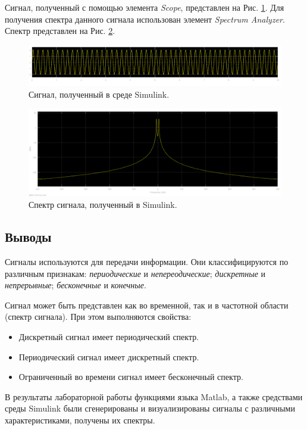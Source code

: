 \documentclass[a4paper,14pt]{extarticle}
\begin{document}
Сигнал, полученный с помощью элемента \textit{Scope}, представлен на Рис. \ref{simulink_signal}. Для получения спектра данного сигнала использован элемент \textit{Spectrum Analyzer}. Спектр представлен на Рис. \ref{simulink_signal_}.
\begin{figure}[H]
\centering
\includegraphics[scale=0.5]{pics/1simulink_001.png}
\caption{Сигнал, полученный в среде Simulink.}
\label{simulink_signal}
\end{figure}
\begin{figure}[H]
\centering
\includegraphics[scale=0.5]{pics/1simulink_spec.png}
\caption{Спектр сигнала, полученный в Simulink.}
\label{simulink_signal_}
\end{figure}

\subsection{Выводы}
Сигналы используются для передачи информации. Они классифицируются по различным признакам: \textit{периодические} и \textit{непереодические}; \textit{дискретные} и \textit{непрерывные}; \textit{бесконечные} и \textit{конечные}.

Сигнал может быть представлен как во временной, так и в частотной области (спектр сигнала). При этом выполняются свойства:
\begin{itemize}
\setlength\itemsep{0.1cm}
\item Дискретный сигнал имеет периодический спектр.
\item Периодический сигнал имеет дискретный спектр.
\item Ограниченный во времени сигнал имеет бесконечный спектр.
\end{itemize}

В результаты лабораторной работы функциями языка Matlab, а также средствами среды Simulink были сгенерированы и визуализированы сигналы с различными характеристиками, получены их спектры.
\end{document}
